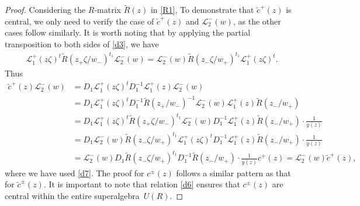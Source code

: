 \documentclass[10pt,a4paper]{amsart}
\numberwithin{equation}{section}
\begin{document}
\begin{proof}{Considering the $R$-matrix $\widetilde{R}(z)$ in \eqref{R1},}
To demonstrate that $\widetilde{c}^+(z)$ is central, we only need to verify the case of $\widetilde{c}^+(z)$ and $\mathcal{L}_2^-(w)$, as the other cases follow similarly. It is worth noting that by applying the partial transposition to both sides of \eqref{d3}, we have
 \begin{gather*}
 \mathcal{L}_1^{+}(z\zeta)^t\widetilde{R}(z_+\zeta/w_-)^{t_1}\mathcal{L}_2^{-}(w)=\mathcal{L}_2^{-}(w) \widetilde{R}(z_-\zeta/w_+)^{t_1}\mathcal{L}_1^{+}(z\zeta)^t.
 \end{gather*}Thus
 \begin{align*}\widetilde{c}^+(z)\mathcal{L}_2^{-}(w)&=
 D_1\mathcal{L}_1^{+}(z\zeta)^tD_1^{-1}\mathcal{L}_1^{+}(z)\mathcal{L}_2^-(w)\\
 &= D_1\mathcal{L}_1^{+}(z\zeta)^tD_1^{-1}\widetilde{R}(z_+/w_-)^{-1}\mathcal{L}_2^-(w)\mathcal{L}_1^{+}(z)\widetilde{R}(z_-/w_+)\\
 &=D_1\mathcal{L}_1^{+}(z\zeta)^t\widetilde{R}(z_+\zeta/w_-)^{t_1}\mathcal{L}_2^{-}(w)D_1^{-1}\mathcal{L}_1^{+}(z)\widetilde{R}(z_-/w_+)\cdot\frac{1}{y(z)}\\
 &=D_1\mathcal{L}_2^{-}(w)\widetilde{R}(z_-\zeta/w_+)^{t_1}\mathcal{L}_1^{+}(z\zeta)^tD_1^{-1}\mathcal{L}_1^{+}(z)\widetilde{R}(z_-/w_+)\cdot\frac{1}{y(z)}\\
 &=\mathcal{L}_2^{-}(w)D_1\widetilde{R}(z_-\zeta/w_+)^{t_1}D_1^{-1}\widetilde{R}(z_-/w_+)\cdot\frac{1}{y(z)}c^+(z)=\mathcal{L}_2^{-}(w)\widetilde{c}^+(z),
 \end{align*}
 where we have used \eqref{d7}.
The proof for $c^{\pm}(z)$ follows a similar pattern as that for $\widetilde{c}^{\pm}(z)$. It is important to note that relation \eqref{d6} ensures that $c^{\pm}(z)$ are central within the entire superalgebra~$U(R)$.
\end{proof}
\end{document}
